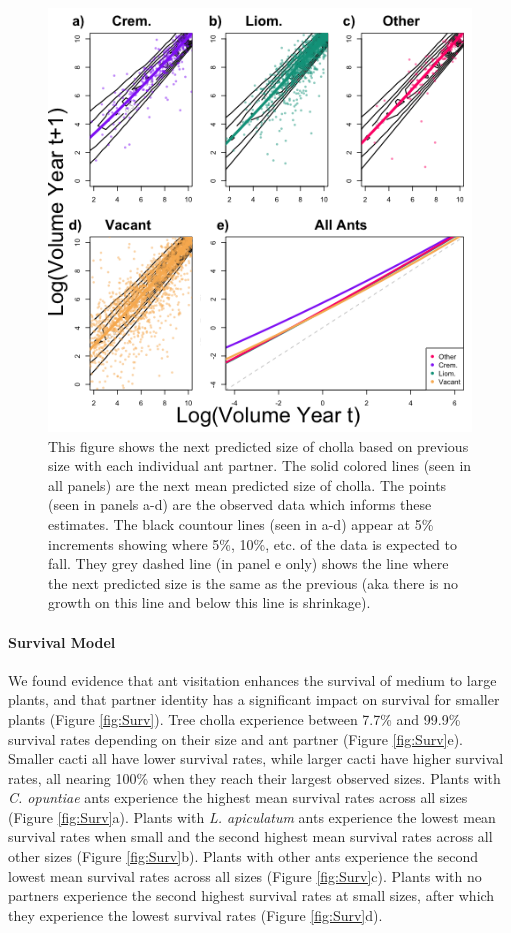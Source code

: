 \documentclass[11pt]{article}
\begin{document}
\begin{figure}
	\includegraphics[width = 0.95\linewidth]{Figures/GrowContourLinesColor.png}
	\caption{This figure shows the next predicted size of cholla based on previous size with each individual ant partner. The solid colored lines (seen in all panels) are the next mean predicted size of cholla. The points (seen in panels a-d) are the observed data which informs these estimates. The black countour lines (seen in a-d) appear at 5\% increments showing where 5\%, 10\%, etc. of the data is expected to fall. They grey dashed line (in panel e only) shows the line where the next predicted size is the same as the previous (aka there is no growth on this line and below this line is shrinkage). }
	\label{fig:Grow}
\end{figure}

\paragraph{Survival Model}
We found evidence that ant visitation enhances the survival of medium to large plants, and that partner identity has a significant impact on survival for smaller plants (Figure \ref{fig:Surv}).
Tree cholla experience between 7.7\% and 99.9\% survival rates depending on 
their size and ant partner (Figure \ref{fig:Surv}e).
Smaller cacti all have lower survival rates, while larger cacti have higher survival rates, all nearing 100\% when they reach their largest observed sizes.
Plants with \textit{C. opuntiae} ants experience the highest mean survival rates across all sizes (Figure \ref{fig:Surv}a).
Plants with \textit{L. apiculatum} ants experience the lowest mean survival rates when small and the second highest mean survival rates across all other sizes (Figure \ref{fig:Surv}b). 
Plants with other ants experience the second lowest mean survival rates across all sizes (Figure \ref{fig:Surv}c).
Plants with no partners experience the second highest survival rates at small sizes, after which they experience the lowest survival rates (Figure \ref{fig:Surv}d). 
\end{document}

